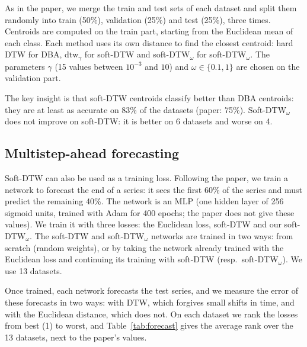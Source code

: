 \documentclass[11pt]{article}
\newcommand{\sdtw}{\mathrm{dtw}_\gamma}
\begin{document}
As in the paper, we merge the train and test sets of each dataset and split them randomly into train (50\%), validation (25\%) and test (25\%), three times. Centroids are computed on the train part, starting from the Euclidean mean of each class. Each method uses its own distance to find the closest centroid: hard DTW for DBA, $\sdtw$ for soft-DTW and soft-DTW$_\omega$ for soft-DTW$_\omega$. The parameters $\gamma$ (15 values between $10^{-3}$ and $10$) and $\omega\in\{0.1,1\}$ are chosen on the validation part.

The key insight is that soft-DTW centroids classify better than DBA centroids: they are at least as accurate on 83\% of the datasets (paper: 75\%). Soft-DTW$_\omega$ does not improve on soft-DTW: it is better on 6 datasets and worse on 4.

\subsection{Multistep-ahead forecasting}
Soft-DTW can also be used as a training loss. Following the paper, we train a network to forecast the end of a series: it sees the first 60\% of the series and must predict the remaining 40\%. The network is an MLP (one hidden layer of 256 sigmoid units, trained with Adam for 400 epochs; the paper does not give these values). We train it with three losses: the Euclidean loss, soft-DTW and our soft-DTW$_\omega$. The soft-DTW and soft-DTW$_\omega$ networks are trained in two ways: from scratch (random weights), or by taking the network already trained with the Euclidean loss and continuing its training with soft-DTW (resp.\ soft-DTW$_\omega$). We use 13 datasets.

Once trained, each network forecasts the test series, and we measure the error of these forecasts in two ways: with DTW, which forgives small shifts in time, and with the Euclidean distance, which does not. On each dataset we rank the losses from best (1) to worst, and Table~\ref{tab:forecast} gives the average rank over the 13 datasets, next to the paper's values.
\end{document}
